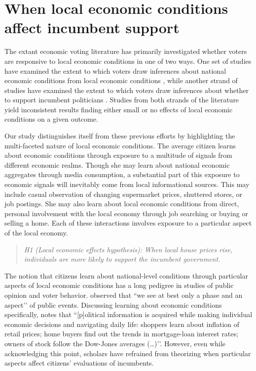 \documentclass[12pt,a4paper]{article}
\begin{document}
	\section{When local economic conditions affect incumbent support}
	
	The extant economic voting literature has primarily investigated whether voters are responsive to local economic conditions in one of two ways. One set of studies have examined the extent to which voters draw inferences about national economic conditions from local economic conditions \citep{books1999contextual,reeves2012ecologies,anderson2011local,ansolabehere2014mecro,bisgaard2016reconsidering}, while another strand of studies have examined the extent to which voters draw inferences about whether to support incumbent politicians  \citep{hansford2015reevaluating,eisenberg2004economic,kim2003spatial,healy2014presidential, hall2017economic,elinder2010local,auberger2005influence}. Studies from both strands of the literature yield inconsistent results finding either small or no effects of local economic conditions on a given outcome.   
	
	Our study distinguishes itself from these previous efforts by highlighting the multi-faceted nature of local economic conditions. The average citizen learns about economic conditions through exposure to a multitude of signals from different economic realms. Though she may learn about national economic aggregates through media consumption, a substantial part of this exposure to economic signals will inevitably come from local informational sources. This may include casual observation of changing supermarket prices, shuttered stores, or job postings. She may also learn about local economic conditions from direct, personal involvement with the local economy through job searching or buying or selling a home. Each of these interactions involves exposure to a particular aspect of the local economy.
	
	\begin{quote}
		\textit{H1 (Local economic effects hypothesis): When local house prices rise, individuals are more likely to support the incumbent government.}
	\end{quote}
	
	The notion that citizens learn about national-level conditions through particular aspects of local economic conditions has a long pedigree in studies of public opinion and voter behavior. \cite[][p. 79]{lippmann1946public} observed that ``we see at best only a phase and an aspect’’ of public events. Discussing learning about economic conditions specifically, \cite[][p. 24]{popkin1994reasoning} notes that ``[p]olitical information is acquired while making individual economic decisions and navigating daily life: shoppers learn about inflation of retail prices; home buyers find out the trends in mortgage-loan interest rates; owners of stock follow the Dow-Jones averages (…)’’\cite[see also][p. 5]{fiorina1981retrospective}. However, even while acknowledging this point, scholars have refrained from theorizing when particular aspects affect citizens’ evaluations of incumbents.
	
\end{document}
